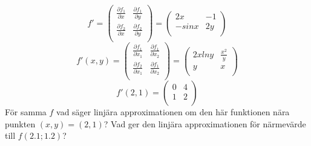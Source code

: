 \documentclass{report}
\begin{document}
\sol 
\begin{equation*}
f' =
\begin{pmatrix}
	\frac{\partial f_1 }{\partial x }  & \frac{\partial f_1 }{\partial y }  \\
	\frac{\partial f_2 }{\partial x }  & \frac{\partial f_2 }{\partial y }  \\
\end{pmatrix}
=
\begin{pmatrix}
	2x & -1 \\
	-sinx & 2y \\
\end{pmatrix}
\end{equation*}
{
\begin{equation*}
f'(x,y) =
\begin{pmatrix}
	\frac{\partial f_1 }{\partial x_1 }  & \frac{\partial f_1 }{\partial x_2 }  \\
	\frac{\partial f_2 }{\partial x_1 }  & \frac{\partial f_1 }{\partial x_2 }  \\
\end{pmatrix}
=
\begin{pmatrix}
	2xlny & \frac{x^2}{y}  \\
	y & x \\
\end{pmatrix}
\end{equation*}
\begin{equation*}
f'(2,1) =
\begin{pmatrix}
	0 & 4 \\
	1 & 2 \\
\end{pmatrix}
\end{equation*}
För samma $ f $ vad säger linjära approximationen om den här funktionen nära punkten $ (x,y) = (2,1) $? Vad ger den linjära approximationen för närmevärde till $ f(2.1;1.2) $?\\\\

}
\end{document}
